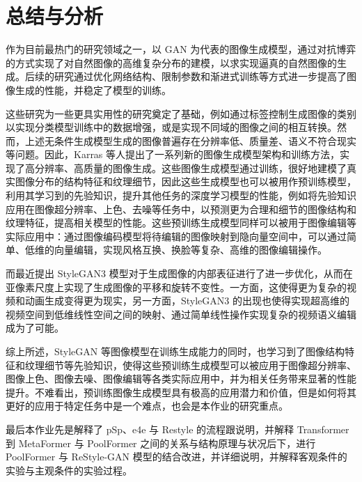 \chapter{总结与分析}
\label{chap:4}


作为目前最热门的研究领域之一，以 GAN 为代表的图像生成模型，通过对抗博弈的方式实现了对自然图像的高维复杂分布的建模，以求实现逼真的自然图像的生成。后续的研究通过优化网络结构、限制参数和渐进式训练等方式进一步提高了图像生成的性能，并稳定了模型的训练。

这些研究为一些更具实用性的研究奠定了基础，例如通过标签控制生成图像的类别以实现分类模型训练中的数据增强，或是实现不同域的图像之间的相互转换。然而，上述无条件生成模型生成的图像普遍存在分辨率低、质量差、语义不符合现实等问题。因此，Karras 等人提出了一系列新的图像生成模型架构和训练方法，实现了高分辨率、高质量的图像生成。这些图像生成模型通过训练，很好地建模了真实图像分布的结构特征和纹理细节，因此这些生成模型也可以被用作预训练模型，利用其学习到的先验知识，提升其他任务的深度学习模型的性能，例如将先验知识应用在图像超分辨率、上色、去噪等任务中，以预测更为合理和细节的图像结构和纹理特征，提高相关模型的性能。这些预训练生成模型同样可以被用于图像编辑等实际应用中：通过图像编码模型将待编辑的图像映射到隐向量空间中，可以通过简单、低维的向量编辑，实现风格互换、换脸等复杂、高维的图像编辑操作。

而最近提出 StyleGAN3 模型对于生成图像的内部表征进行了进一步优化，从而在亚像素尺度上实现了生成图像的平移和旋转不变性。一方面，这使得更为复杂的视频和动画生成变得更为现实，另一方面，StyleGAN3 的出现也使得实现超高维的视频空间到低维线性空间之间的映射、通过简单线性操作实现复杂的视频语义编辑成为了可能。

综上所述，StyleGAN 等图像模型在训练生成能力的同时，也学习到了图像结构特征和纹理细节等先验知识，使得这些预训练生成模型可以被应用于图像超分辨率、图像上色、图像去噪、图像编辑等各类实际应用中，并为相关任务带来显著的性能提升。不难看出，预训练图像生成模型具有极高的应用潜力和价值，但是如何将其更好的应用于特定任务中是一个难点，也会是本作业的研究重点。

最后本作业先是解释了 pSp、e4e 与 Restyle 的流程跟说明，并解释 Transformer 到 MetaFormer 与 PoolFormer 之间的关系与结构原理与状况后下，进行 PoolFormer 与 ReStyle-GAN 模型的结合改进，并详细说明，并解释客观条件的实验与主观条件的实验过程。